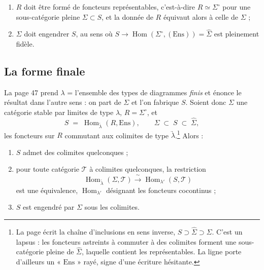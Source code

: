 \documentclass[11pt,a4paper]{article}
\begin{document}
\begin{enumerate}
\item[a)] $R$ doit être formé de foncteurs représentables, c'est-à-dire
$R \simeq \Sigma^{\circ}$ pour une sous-catégorie pleine $\Sigma \subset S$,
et la donnée de $R$ équivaut alors à celle de $\Sigma$ ;
\item[b)] $\Sigma$ doit engendrer $S$, au sens où
$S \to \operatorname{Hom}(\Sigma^{\circ}, (\mathrm{Ens})) = \widehat{\Sigma}$
est pleinement fidèle.
\end{enumerate}

\subsection*{La forme finale}

La page 47 prend $\lambda$ = l'ensemble des types de diagrammes \emph{finis} et
énonce le résultat dans l'autre sens : on part de $\Sigma$ et l'on fabrique
$S$. Soient donc $\Sigma$ une catégorie stable par limites de type $\lambda$,
$R = \Sigma^{\circ}$, et
\[
S \;=\; \operatorname{Hom}_{\underrightarrow{\lambda}}(R, \mathrm{Ens}),
\qquad \Sigma \;\subset\; S \;\subset\; \widehat{\Sigma},
\]
les foncteurs sur $R$ commutant aux colimites de type
$\underrightarrow{\lambda}$.\footnote{La page écrit la chaîne d'inclusions en
sens inverse, $S \supset \widehat{\Sigma} \supset \Sigma$. C'est un lapsus :
les foncteurs astreints à commuter à des colimites forment une sous-catégorie
pleine de $\widehat{\Sigma}$, laquelle contient les représentables. La ligne
porte d'ailleurs un « $\mathrm{Ens}$ » rayé, signe d'une écriture hésitante.}
Alors :

\begin{enumerate}
\item[a)] $S$ admet des colimites quelconques ;
\item[b)] pour toute catégorie $\mathcal{T}$ à colimites quelconques, la
restriction
\[
\operatorname{Hom}_{\underrightarrow{\lambda}}(\Sigma, \mathcal{T})
\xrightarrow{\ \sim\ } \operatorname{Hom}_{\lambda'}(S, \mathcal{T})
\]
est une équivalence, $\operatorname{Hom}_{\lambda'}$ désignant les foncteurs
cocontinus ;
\item[c)] $S$ est engendré par $\Sigma$ sous les colimites.
\end{enumerate}
\end{document}
